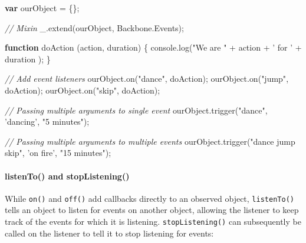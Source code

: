 \documentclass[9pt]{book}
\newenvironment{Shaded}{}{}
\newcommand{\KeywordTok}[1]{\textcolor[rgb]{0.00,0.44,0.13}{\textbf{{#1}}}}
\newcommand{\StringTok}[1]{\textcolor[rgb]{0.25,0.44,0.63}{{#1}}}
\newcommand{\CommentTok}[1]{\textcolor[rgb]{0.38,0.63,0.69}{\textit{{#1}}}}
\newcommand{\OtherTok}[1]{\textcolor[rgb]{0.00,0.44,0.13}{{#1}}}
\newcommand{\FunctionTok}[1]{\textcolor[rgb]{0.02,0.16,0.49}{{#1}}}
\newcommand{\NormalTok}[1]{{#1}}
\begin{document}
\begin{Shaded}
\begin{Highlighting}[]
\KeywordTok{var} \NormalTok{ourObject = \{\};}

\CommentTok{// Mixin}
\OtherTok{_}\NormalTok{.}\FunctionTok{extend}\NormalTok{(ourObject, }\OtherTok{Backbone}\NormalTok{.}\FunctionTok{Events}\NormalTok{);}

\KeywordTok{function} \FunctionTok{doAction} \NormalTok{(action, duration) \{}
  \OtherTok{console}\NormalTok{.}\FunctionTok{log}\NormalTok{(}\StringTok{"We are "} \NormalTok{+ action + }\StringTok{' for '} \NormalTok{+ duration ); }
\NormalTok{\}}

\CommentTok{// Add event listeners}
\OtherTok{ourObject}\NormalTok{.}\FunctionTok{on}\NormalTok{(}\StringTok{"dance"}\NormalTok{, doAction);}
\OtherTok{ourObject}\NormalTok{.}\FunctionTok{on}\NormalTok{(}\StringTok{"jump"}\NormalTok{, doAction);}
\OtherTok{ourObject}\NormalTok{.}\FunctionTok{on}\NormalTok{(}\StringTok{"skip"}\NormalTok{, doAction);}

\CommentTok{// Passing multiple arguments to single event}
\OtherTok{ourObject}\NormalTok{.}\FunctionTok{trigger}\NormalTok{(}\StringTok{"dance"}\NormalTok{, }\StringTok{'dancing'}\NormalTok{, }\StringTok{"5 minutes"}\NormalTok{);}

\CommentTok{// Passing multiple arguments to multiple events}
\OtherTok{ourObject}\NormalTok{.}\FunctionTok{trigger}\NormalTok{(}\StringTok{"dance jump skip"}\NormalTok{, }\StringTok{'on fire'}\NormalTok{, }\StringTok{"15 minutes"}\NormalTok{);}
\end{Highlighting}
\end{Shaded}

\paragraph{listenTo() and
stopListening()}\label{listento-and-stoplistening}

While \texttt{on()} and \texttt{off()} add callbacks directly to an
observed object, \texttt{listenTo()} tells an object to listen for
events on another object, allowing the listener to keep track of the
events for which it is listening. \texttt{stopListening()} can
subsequently be called on the listener to tell it to stop listening for
events:
\end{document}
